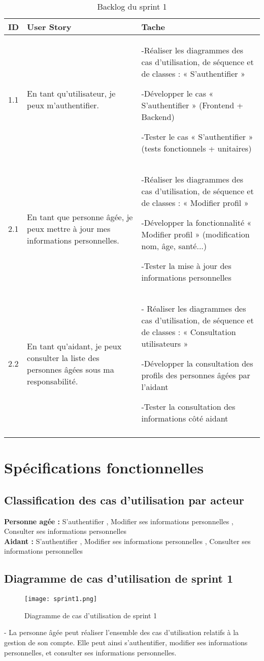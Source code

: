 \documentclass[12pt,a4paper]{report}
\begin{document}
\begin{longtable}{|p{2cm}|p{5cm}|p{7cm}|}
\hline
\textbf{ID} & \textbf{User Story} & \textbf{Tache} \\
\hline
1.1 & En tant qu’utilisateur, je peux m’authentifier.& -Réaliser les diagrammes des cas d’utilisation, de séquence et de classes : « S’authentifier »

-Développer le cas « S’authentifier » (Frontend + Backend)

-Tester le cas « S’authentifier » (tests fonctionnels + unitaires)
 \\
\hline
2.1 & En tant que personne âgée, je peux mettre à jour mes informations personnelles. & -Réaliser les diagrammes des cas d’utilisation, de séquence et de classes : « Modifier profil »

-Développer la fonctionnalité « Modifier profil » (modification nom, âge, santé...)

-Tester la mise à jour des informations personnelles
 \\
\hline
2.2 & En tant qu’aidant, je peux consulter la liste des personnes âgées sous ma responsabilité. &- Réaliser les diagrammes des cas d’utilisation, de séquence et de classes : « Consultation utilisateurs »

-Développer la consultation des profils des personnes âgées par l’aidant

-Tester la consultation des informations côté aidant
 \\
\hline
\caption{Backlog du sprint 1}
\label{backlogSprint1}
\end{longtable}

\section{Spécifications fonctionnelles}

\subsection{Classification des cas d’utilisation par acteur }
\textbf{Personne agée :} 
S’authentifier , Modifier ses informations personnelles , Consulter ses informations personnelles  
\\
\textbf{Aidant :} S’authentifier , Modifier ses informations personnelles , Consulter ses informations personnelles 
 \\
 \subsection{Diagramme de cas d'utilisation de sprint 1}
\begin{figure}[H] 
    \centering
    \texttt{[image: sprint1.png]}
    \caption{Diagramme de  cas d'utilisation de sprint 1}
    \label{fig:diagSprint1}
\end{figure}
-	La personne âgée peut réaliser l’ensemble des cas d’utilisation relatifs à la gestion de son compte. Elle peut ainsi s’authentifier, modifier ses informations personnelles, et consulter ses informations personnelles.
\end{document}
